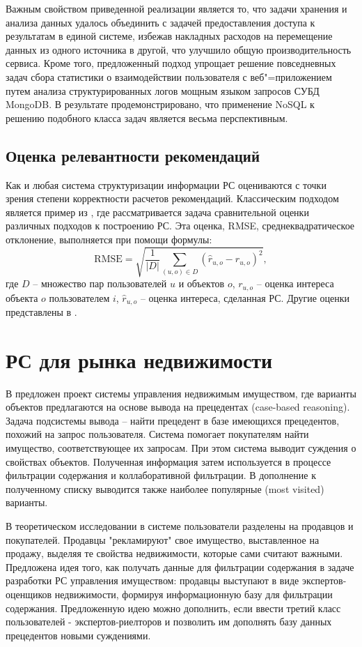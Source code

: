 \documentclass[a4paper,14pt,openany,final]{extreport} %
\begin{document}
    Важным свойством приведенной реализации является то, что задачи хранения и анализа данных удалось объединить с задачей предоставления доступа к результатам в единой системе, избежав накладных расходов на перемещение данных из одного источника в другой, что улучшило общую производительность сервиса. Кроме того, предложенный подход упрощает решение повседневных задач сбора статистики о взаимодействии пользователя с веб"=приложением путем анализа структурированных логов мощным языком запросов СУБД MongoDB.  В результате продемонстрировано, что применение NoSQL к решению подобного класса задач является весьма перспективным.

\subsection{Оценка релевантности рекомендаций}
\label{sec:rs-eval}

Как и любая система структуризации информации РС оцениваются с точки зрения степени корректности расчетов рекомендаций. Классическим подходом является пример из \cite{b13}, где рассматривается задача сравнительной оценки различных подходов к построению РС.  Эта оценка, RMSE, среднеквадратическое отклонение, выполняется при помощи формулы:
    \[
      \mbox{RMSE}=\sqrt{\frac{1}{|D|}\sum_{(u,o)\in D}(\hat{r}_{u,o}-r_{u,o})^2},
    \]
где $D$ -- множество пар пользователей $u$ и объектов $o$, $r_{u,o}$ -- оценка интереса объекта $o$ пользователем $i$, \(\hat{r}_{u,o}\) -- оценка интереса, сделанная РС. Другие оценки представлены в \cite{b10}. %




\section{РС для рынка недвижимости}
\label{sec:ex-retail}


В \cite{b18} предложен проект системы управления недвижимым имуществом, где варианты объектов предлагаются на основе вывода на прецедентах (case-based reasoning). Задача подсистемы вывода – найти  прецедент в базе имеющихся прецедентов, похожий на запрос пользователя. Система помогает покупателям найти имущество, соответствующее их запросам. При этом система выводит суждения о свойствах объектов. Полученная информация затем используется в процессе фильтрации содержания и коллаборативной фильтрации. В дополнение к полученному списку выводится также наиболее популярные (most visited) варианты.

В теоретическом исследовании \cite{b15} в системе пользователи разделены на продавцов и покупателей. Продавцы "рекламируют" свое имущество, выставленное на продажу, выделяя те свойства недвижимости, которые сами считают важными. Предложена идея того, как получать данные для фильтрации содержания в задаче разработки РС управления имуществом: продавцы выступают в виде экспертов-оценщиков недвижимости, формируя информационную базу для фильтрации содержания. Предложенную идею можно дополнить, если ввести третий класс пользователей - экспертов-риелторов и позволить им дополнять базу данных прецедентов новыми суждениями.
\end{document}
